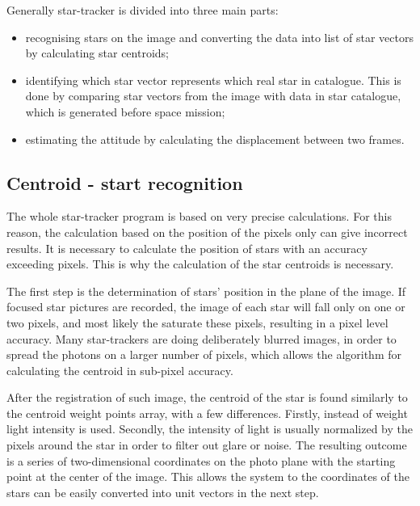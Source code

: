 \documentclass[12pt,a4paper,oneside]{article}
\begin{document}
Generally star-tracker is divided into three main parts\citet{6187242}:
\begin{itemize}
\item recognising stars on the image and converting the data into list of star vectors by calculating star centroids;
\item identifying which star vector represents which real star in catalogue. This is done by comparing star vectors from the image with data in star catalogue, which is generated before space mission;
\item estimating the attitude by calculating the displacement between two frames.
\end{itemize}

\subsection{Centroid - start recognition}
\citet{samaan2002predictive}

\citet{liebe2002accuracy}


The whole star-tracker program is based on very precise calculations. For this reason, the calculation based on the position of the pixels only can give incorrect results. It is necessary to calculate the position of stars with an accuracy exceeding pixels. This is why the calculation of the star centroids is necessary.

The first step is the determination of stars' position in the plane of the image. If focused star pictures are recorded, the image of each star will fall only on one or two pixels, and most likely the saturate these pixels, resulting in a pixel level accuracy.
Many star-trackers are doing deliberately blurred images, in order to spread the photons on a larger number of pixels, which allows the algorithm for calculating the centroid in sub-pixel accuracy.

After the registration of such image, the centroid of the star is found similarly to the centroid weight points array, with a few differences. Firstly, instead of weight light intensity is used. Secondly, the intensity of light is usually normalized by the pixels around the star in order to filter out glare or noise. The resulting outcome is a series of two-dimensional coordinates on the photo plane with the starting point at the center of the image. This allows the system to the coordinates of the stars can be easily converted into unit vectors in the next step.
\end{document}
